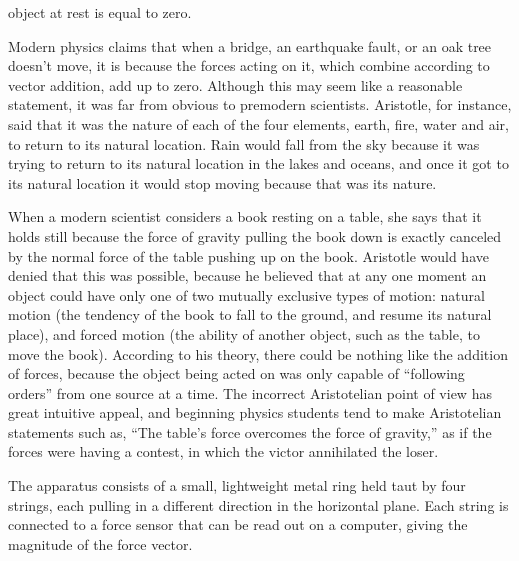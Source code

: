 \label{lab:force_vector_digital}

\apparatus
{}

object at rest is equal to zero.

\introduction

Modern physics claims that when a bridge, an earthquake
fault, or an oak tree doesn't move, it is because the forces
acting on it, which combine according to vector addition,
add up to zero.  Although this may seem like a reasonable
statement, it was far from obvious to premodern scientists. 
Aristotle, for instance, said that it was the nature of each
of the four elements, earth, fire, water and air, to return
to its natural location.  Rain would fall from the sky
because it was trying to return to its natural location in
the lakes and oceans, and once it got to its natural
location it would stop moving because that was its nature.

When a modern scientist considers a book resting on a table,
she says that it holds still because the force of gravity
pulling the book down is exactly canceled by the normal
force of the table pushing up on the book.  Aristotle would
have denied that this was possible, because he believed that
at any one moment an object could have only one of two
mutually exclusive types of motion: natural motion (the
tendency of the book to fall to the ground, and resume its
natural place), and forced motion (the ability of another
object, such as the table, to move the book).  According to
his theory, there could be nothing like the addition of
forces, because the object being acted on was only capable
of ``following orders''  from one source at a time.  The
incorrect Aristotelian point of view has great intuitive
appeal, and beginning physics students tend to make
Aristotelian statements such as, ``The table's force
overcomes the force of gravity,'' as if the forces were
having a contest, in which the victor annihilated the loser.


\observations

The apparatus consists of a small, lightweight metal ring
held taut by four strings, each pulling in a different direction
in the horizontal plane. Each string is connected to a force sensor
that can be read out on a computer, giving the magnitude of the
force vector.


